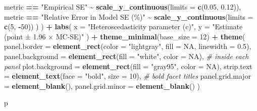 \documentclass[
  twocolumn]{article}
\newenvironment{Shaded}{\begin{snugshade}}{\end{snugshade}}
\newcommand{\AttributeTok}[1]{\textcolor[rgb]{0.13,0.29,0.53}{#1}}
\newcommand{\CommentTok}[1]{\textcolor[rgb]{0.56,0.35,0.01}{\textit{#1}}}
\newcommand{\ConstantTok}[1]{\textcolor[rgb]{0.56,0.35,0.01}{#1}}
\newcommand{\DecValTok}[1]{\textcolor[rgb]{0.00,0.00,0.81}{#1}}
\newcommand{\FloatTok}[1]{\textcolor[rgb]{0.00,0.00,0.81}{#1}}
\newcommand{\FunctionTok}[1]{\textcolor[rgb]{0.13,0.29,0.53}{\textbf{#1}}}
\newcommand{\NormalTok}[1]{#1}
\newcommand{\SpecialCharTok}[1]{\textcolor[rgb]{0.81,0.36,0.00}{\textbf{#1}}}
\newcommand{\StringTok}[1]{\textcolor[rgb]{0.31,0.60,0.02}{#1}}
\begin{document}
\begin{Shaded}
\begin{Highlighting}[]
\NormalTok{      metric }\SpecialCharTok{==} \StringTok{"Empirical SE"} \SpecialCharTok{\textasciitilde{}} \FunctionTok{scale\_y\_continuous}\NormalTok{(}\AttributeTok{limits =} \FunctionTok{c}\NormalTok{(}\FloatTok{0.05}\NormalTok{, }\FloatTok{0.12}\NormalTok{)),}
\NormalTok{      metric }\SpecialCharTok{==} \StringTok{"Relative Error in Model SE (\%)"} \SpecialCharTok{\textasciitilde{}} \FunctionTok{scale\_y\_continuous}\NormalTok{(}\AttributeTok{limits =} \FunctionTok{c}\NormalTok{(}\DecValTok{5}\NormalTok{, }\SpecialCharTok{{-}}\DecValTok{50}\NormalTok{))}
\NormalTok{    )}
\NormalTok{  ) }\SpecialCharTok{+}
  \FunctionTok{labs}\NormalTok{(}
    \AttributeTok{x =} \StringTok{"Heteroscedasticity parameter (c)"}\NormalTok{,}
    \AttributeTok{y =} \StringTok{"Estimate (point ± 1.96 × MC{-}SE)"}
\NormalTok{  ) }\SpecialCharTok{+}
  \FunctionTok{theme\_minimal}\NormalTok{(}\AttributeTok{base\_size =} \DecValTok{12}\NormalTok{) }\SpecialCharTok{+}
  \FunctionTok{theme}\NormalTok{(}
    \AttributeTok{panel.border =} \FunctionTok{element\_rect}\NormalTok{(}\AttributeTok{color =} \StringTok{"lightgray"}\NormalTok{, }\AttributeTok{fill =} \ConstantTok{NA}\NormalTok{, }\AttributeTok{linewidth =} \FloatTok{0.5}\NormalTok{),}
    \AttributeTok{panel.background =} \FunctionTok{element\_rect}\NormalTok{(}\AttributeTok{fill =} \StringTok{"white"}\NormalTok{, }\AttributeTok{color =} \ConstantTok{NA}\NormalTok{),     }\CommentTok{\# inside each panel}
    \AttributeTok{plot.background  =} \FunctionTok{element\_rect}\NormalTok{(}\AttributeTok{fill =} \StringTok{"gray95"}\NormalTok{, }\AttributeTok{color =} \ConstantTok{NA}\NormalTok{),}
    \AttributeTok{strip.text =} \FunctionTok{element\_text}\NormalTok{(}\AttributeTok{face =} \StringTok{"bold"}\NormalTok{, }\AttributeTok{size =} \DecValTok{10}\NormalTok{),            }\CommentTok{\# bold facet titles}
    \AttributeTok{panel.grid.major =} \FunctionTok{element\_blank}\NormalTok{(),}
    \AttributeTok{panel.grid.minor =} \FunctionTok{element\_blank}\NormalTok{()}
\NormalTok{  )}

\NormalTok{p}


\end{Highlighting}
\end{Shaded}
\end{document}
